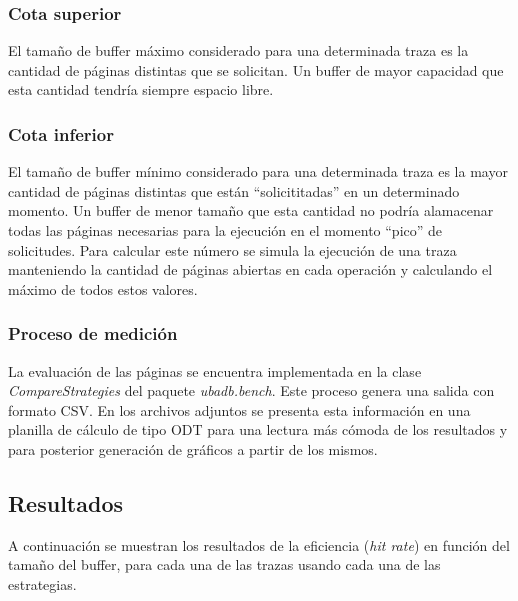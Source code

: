 \subsubsection*{Cota superior}
El tama\~no de buffer m\'aximo considerado para una determinada traza es la cantidad de p\'aginas distintas que se solicitan. Un buffer
de mayor capacidad que esta cantidad tendr\'ia siempre espacio libre.  

\subsubsection*{Cota inferior}
El tama\~no de buffer m\'inimo considerado para una determinada traza es la mayor cantidad de p\'aginas distintas que est\'an ``solicititadas''
en un determinado momento. Un buffer de menor tama\~no que esta cantidad no podr\'ia alamacenar todas las p\'aginas necesarias para la ejecuci\'on 
en el momento ``pico'' de solicitudes. Para calcular este n\'umero se simula la ejecuci\'on de una traza manteniendo la cantidad de p\'aginas abiertas
en cada operaci\'on y calculando el m\'aximo de todos estos valores. 

\subsubsection{Proceso de medici\'on}
La evaluaci\'on de las p\'aginas se encuentra implementada en la clase \textit{CompareStrategies} del paquete \textit{ubadb.bench}. 
Este proceso genera una salida con formato CSV. En los archivos adjuntos se presenta esta informaci\'on en una planilla de 
c\'alculo de tipo ODT para una lectura m\'as c\'omoda de los resultados y para posterior generaci\'on de gr\'aficos a partir de 
los mismos.

\subsection{Resultados}
A continuaci\'on se muestran los resultados de la eficiencia (\textit{hit rate}) en funci\'on del tama\~no del buffer, para cada una de las trazas usando cada una de las
estrategias.
